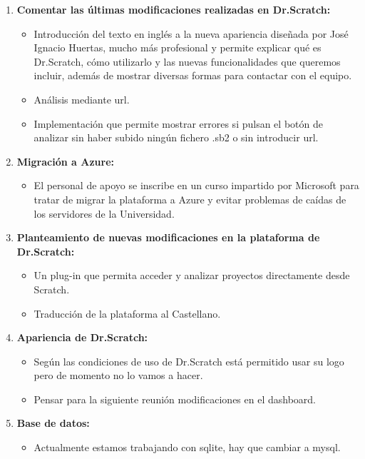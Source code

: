 \documentclass[a4paper,12pt]{letter}
\begin{document}
\begin{letter}
\begin{enumerate}
    
    \item {\textbf {Comentar las últimas modificaciones realizadas en Dr.Scratch:}}
    \begin{itemize}
        \item {Introducción del texto en inglés a la nueva apariencia diseñada por José Ignacio Huertas, mucho más profesional y permite explicar qué es Dr.Scratch, cómo utilizarlo y las nuevas funcionalidades que queremos incluir, además de mostrar diversas formas para contactar con el equipo.}
        \item {Análisis mediante url.}
        \item {Implementación que permite mostrar errores si pulsan el botón de analizar sin haber subido ningún fichero .sb2 o sin introducir url.}
    \end{itemize}

    \item{\textbf {Migración a Azure:}}
    \begin{itemize}
        \item {El personal de apoyo se inscribe en un curso impartido por Microsoft para tratar de migrar la plataforma a Azure y evitar problemas de caídas de los servidores de la Universidad.}

    \end{itemize}

	\item{\textbf {Planteamiento de nuevas modificaciones en la plataforma de 
                    Dr.Scratch:}}
    \begin{itemize}
        \item {Un plug-in que permita acceder y analizar proyectos directamente desde Scratch.}
        \item {Traducción de la plataforma al Castellano.}
    \end{itemize}

    \item {\textbf {Apariencia de Dr.Scratch:}}
        \begin{itemize}
            \item {Según las condiciones de uso de Dr.Scratch está permitido usar su logo pero de momento no lo vamos a hacer.}
            \item {Pensar para la siguiente reunión modificaciones en el dashboard.}
        \end{itemize}

    \item {\textbf {Base de datos:}}
        \begin{itemize}
            \item {Actualmente estamos trabajando con sqlite, hay que cambiar a mysql.}
        \end{itemize}
\end{enumerate}


\end{letter}
\end{document}
